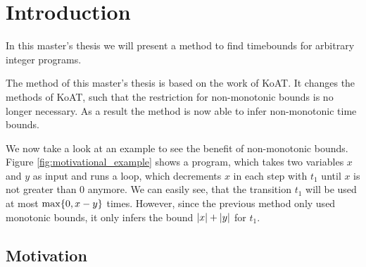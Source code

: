 \section{Introduction}

In this master's thesis we will present a method to find timebounds for arbitrary integer programs.

The method of this master's thesis is based on the work of KoAT.
It changes the methods of KoAT, such that the restriction for non-monotonic bounds is no longer necessary.
As a result the method is now able to infer non-monotonic time bounds.

We now take a look at an example to see the benefit of non-monotonic bounds.
Figure \ref{fig:motivational_example} shows a program, which takes two variables $x$ and $y$ as input and runs a loop, which decrements $x$ in each step with $t_1$ until $x$ is not greater than 0 anymore.
We can easily see, that the transition $t_1$ will be used at most $\max \lbrace 0, x-y \rbrace$ times.
However, since the previous method only used monotonic bounds, it only infers the bound $\left|x\right|+\left|y\right|$ for $t_1$.

\subsection{Motivation}




